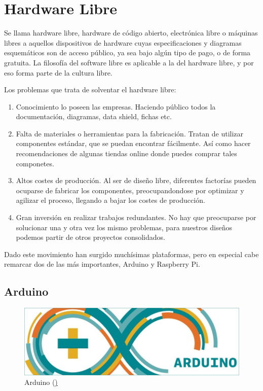 \bigskip

\newpage

\section{Hardware Libre}


Se llama hardware libre, hardware de código abierto, electrónica libre o máquinas libres a aquellos dispositivos de hardware cuyas especificaciones y diagramas esquemáticos son de acceso público, ya sea bajo algún tipo de pago, o de forma gratuita. La filosofía del software libre es aplicable a la del hardware libre, y por eso forma parte de la cultura libre. \cite{HWLIBRE}

Los problemas que trata de solventar el hardware libre:

\bigskip
\begin{enumerate}
	\item Conocimiento lo poseen las empresas.
	Haciendo público todos la documentación, diagramas, data shield, fichas etc.

	\item Falta de materiales o herramientas para la fabricación.
	Tratan de utilizar componentes estándar, que se puedan encontrar fácilmente. 
	Así como hacer recomendaciones de algunas tiendas online donde puedes comprar tales componetes.  

	\item Altos costes de producción.
	Al ser de diseño libre, diferentes factorías pueden ocuparse de fabricar los componentes, preocupandondose por optimizar y agilizar el proceso, llegando a bajar los costes de producción.

	\item Gran inversión en realizar trabajos redundantes. 
	No hay que preocuparse por solucionar una y otra vez los mismo problemas, para nuestros diseños podemos partir de otros proyectos consolidados.
		  
\end{enumerate}


Dado este movimiento han surgido muchísimas plataformas, pero en especial cabe remarcar dos de las más importantes, Arduino y Raspberry Pi.

\newpage
\subsection{Arduino}


\begin{figure}
\centering
\includegraphics[width=0.5\linewidth]{../images/arduino}
\caption[Arduino]{Arduino (\href{https://www.arduino.cc/})}
\label{fig:arduino}
\end{figure}



